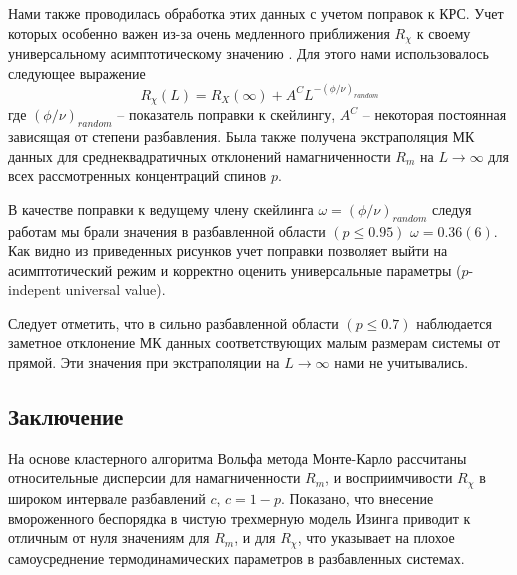 Нами также проводилась обработка этих данных с учетом поправок к КРС. Учет которых особенно важен из-за очень медленного приближения $R_\chi$ к своему универсальному асимптотическому значению \cite{ph2_3}. Для этого нами использовалось следующее выражение
\begin{equation}
  R_\chi(L) = R_X(\infty)+A^C L^{-(\phi/\nu)_{random}}
\end{equation}
где $(\phi/\nu)_{random}$ – показатель поправки к скейлингу, $A^C$ – некоторая постоянная зависящая от степени разбавления. 
Была также получена экстраполяция МК данных для среднеквадратичных отклонений намагниченности $R_m$ на $L \rightarrow \infty$  для всех рассмотренных концентраций спинов $p$. 

В качестве поправки к ведущему члену скейлинга $\omega = (\phi/\nu)_{random}$  следуя работам \cite{ph2_8,ph2_9} мы брали значения в разбавленной области $(p\le0.95)$ $\omega=0.36(6)$.
Как видно из приведенных рисунков учет поправки позволяет выйти на асимптотический режим и корректно оценить универсальные параметры ($p$-indepent universal value). 

Следует отметить, что в сильно разбавленной области $(p\le0.7)$ наблюдается заметное отклонение МК данных соответствующих малым размерам системы от прямой. Эти значения при экстраполяции на $L \rightarrow \infty$    нами не учитывались.






\subsection{Заключение}


На основе кластерного алгоритма Вольфа метода Монте-Карло рассчитаны относительные дисперсии для намагниченности $R_m$, и восприимчивости $R_\chi$ в широком интервале разбавлений $c$, $c=1-p$. 
Показано, что внесение вмороженного беспорядка в чистую трехмерную модель Изинга приводит к отличным от нуля значениям для $R_m$, и для $R_\chi$, что указывает на плохое самоусреднение термодинамических параметров в разбавленных системах.


